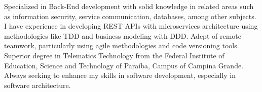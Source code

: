 \begin{cvletter}
  Specialized in Back-End development with solid knowledge in related areas such as information security, service communication, databases, among other subjects. I have experience in developing REST APIs with microservices architecture using methodologies like TDD and business modeling with DDD.
  Adept of remote teamwork, particularly using agile methodologies and code versioning tools.
  Superior degree in Telematics Technology from the Federal Institute of Education, Science and Technology of Paraíba, Campus of Campina Grande.
  Always seeking to enhance my skills in software development, especially in software architecture.

\end{cvletter}